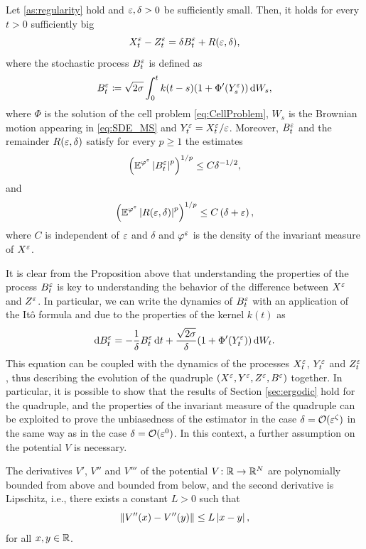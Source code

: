 \documentclass[review,onefignum,onetabnum]{siamonline190516}
\begin{document}
\begin{proposition} \label{prop:zeta} Let \cref{as:regularity} hold and $\varepsilon,\delta>0$ be sufficiently small. Then, it holds for every $t > 0$ sufficiently big 
	\begin{equation}
	X_t^\varepsilon - Z_t^\varepsilon = \delta B^\varepsilon_t + R(\varepsilon,\delta),
	\end{equation}
	where the stochastic process $B_t^\varepsilon$ is defined as
	\begin{equation}\label{eq:defBeta}
	B_t^\epl \defeq \sqrt{2\sigma} \int_0^t k(t-s)(1 + \Phi'(Y_s^\epl)) \dd W_s,
	\end{equation}
	where $\Phi$ is the solution of the cell problem \eqref{eq:CellProblem}, $W_s$ is the Brownian motion appearing in \eqref{eq:SDE_MS} and $Y_t^\varepsilon = X_t^\varepsilon / \varepsilon$. Moreover, $B_t^\varepsilon$ and the remainder $R(\varepsilon,\delta)$ satisfy for every $p \geq 1$ the estimates
	\begin{equation} \label{eq:estimate_beta}
	\left( \E^{\phi^\epl} \abs{B_t^\epl}^p \right)^{1/p} \leq C \delta^{-1/2},
	\end{equation}
	and
	\begin{equation} \label{eq:remainder_zeta}
	\left( \E^{\phi^\epl} \left| R(\epl,\delta) \right|^p \right)^{1/p} \le C \left( \delta + \epl \right),
	\end{equation}
	where $C$ is independent of $\varepsilon$ and $\delta$ and $\varphi^\varepsilon$ is the density of the invariant measure of $X^\varepsilon$.
\end{proposition}

It is clear from the Proposition above that understanding the properties of the process $B_t^\varepsilon$ is key to understanding the behavior of the difference between $X^\varepsilon$ and $Z^\varepsilon$. In particular, we can write the dynamics of $B_t^\varepsilon$ with an application of the Itô formula and due to the properties of the kernel $k(t)$ as
\begin{equation}
	\mathrm{d} B_t^\varepsilon = - \frac1\delta B_t^\varepsilon \,\mathrm{d} t + \frac{\sqrt{2\sigma}}{\delta}(1+\Phi'(Y_t^\varepsilon)) \,\mathrm{d} W_t.
\end{equation}
This equation can be coupled with the dynamics of the processes $X_t^\varepsilon$, $Y_t^\varepsilon$ and $Z_t^\varepsilon$, thus describing the evolution of the quadruple $(X^\varepsilon, Y^\varepsilon, Z^\varepsilon, B^\varepsilon)$ together. In particular, it is possible to show that the results of Section \ref{sec:ergodic} hold for the quadruple, and the properties of the invariant measure of the quadruple can be exploited to prove the unbiasedness of the estimator in the case $\delta = \mathcal O(\varepsilon^\zeta)$ in the same way as in the case $\delta = \mathcal O(\varepsilon^0)$. In this context, a further assumption on the potential $V$ is necessary.
\begin{assumption}\label{as:regularityZeta} The derivatives $V'$, $V''$ and $V'''$ of the potential $V \colon \mathbb{R} \to \mathbb{R}^N$ are polynomially bounded from above and bounded from below, and the second derivative is Lipschitz, i.e., there exists a constant $L > 0$ such that
	\begin{equation}
		\left\|V''(x)-V''(y)\right\| \leq L \left\lvert x - y\right\rvert,
	\end{equation}
	for all $x, y \in \mathbb{R}$.
\end{assumption}
\end{document}
